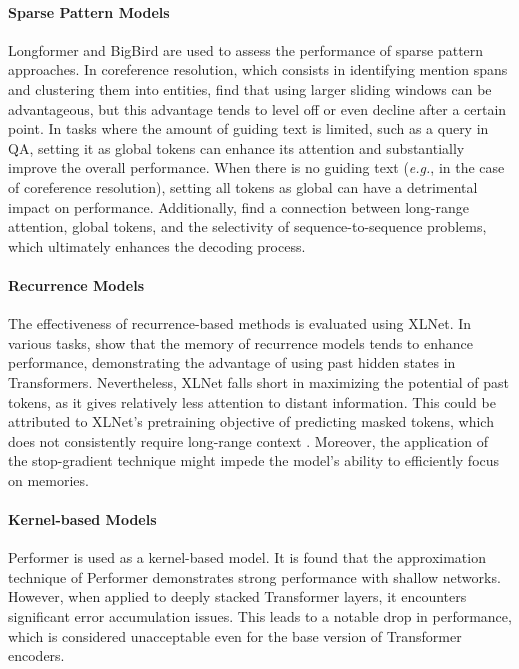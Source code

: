 \paragraph{Sparse Pattern Models}

Longformer and BigBird are used to assess the performance of sparse pattern approaches. In coreference resolution, which consists in identifying mention spans and clustering them into entities, \citet{qin2022nlp} find that using larger sliding windows can be advantageous, but this advantage tends to level off or even decline after a certain point. In tasks where the amount of guiding text is limited, such as a query in \ac{QA}, setting it as global tokens can enhance its attention and substantially improve the overall performance. When there is no guiding text (\textit{e.g.}, in the case of coreference resolution), setting all tokens as global can have a detrimental impact on performance. Additionally, \citet{qin2022nlp} find a connection between long-range attention, global tokens, and the selectivity of sequence-to-sequence problems, which ultimately enhances the decoding process.

\paragraph{Recurrence Models} 

The effectiveness of recurrence-based methods is evaluated using XLNet. In various tasks, \citet{qin2022nlp} show that the memory of recurrence models tends to enhance performance, demonstrating the advantage of using past hidden states in Transformers. Nevertheless, XLNet falls short in maximizing the potential of past tokens, as it gives relatively less attention to distant information. This could be attributed to XLNet's pretraining objective of predicting masked tokens, which does not consistently require long-range context \citep{sun2021long}. Moreover, the application of the stop-gradient technique might impede the model's ability to efficiently focus on memories.

\paragraph{Kernel-based Models} 

Performer is used as a kernel-based model. It is found that the approximation technique of Performer demonstrates strong performance with shallow networks. However, when applied to deeply stacked Transformer layers, it encounters significant  error accumulation issues. This leads to a notable drop in performance, which is considered unacceptable even for the base version of Transformer encoders. \\

